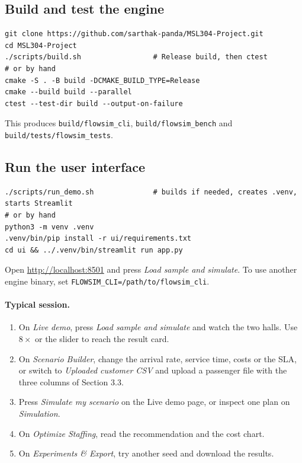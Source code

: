 \documentclass[11pt,a4paper]{article}
\newcommand{\code}[1]{\texttt{#1}}
\begin{document}
\subsection{Build and test the engine}
\begin{lstlisting}
git clone https://github.com/sarthak-panda/MSL304-Project.git
cd MSL304-Project
./scripts/build.sh                 # Release build, then ctest
# or by hand
cmake -S . -B build -DCMAKE_BUILD_TYPE=Release
cmake --build build --parallel
ctest --test-dir build --output-on-failure
\end{lstlisting}
This produces \code{build/flowsim\_cli}, \code{build/flowsim\_bench} and \code{build/tests/flowsim\_tests}.

\subsection{Run the user interface}
\begin{lstlisting}
./scripts/run_demo.sh              # builds if needed, creates .venv, starts Streamlit
# or by hand
python3 -m venv .venv
.venv/bin/pip install -r ui/requirements.txt
cd ui && ../.venv/bin/streamlit run app.py
\end{lstlisting}
Open \url{http://localhost:8501} and press \emph{Load sample and simulate}. To use another engine binary, set
\code{FLOWSIM\_CLI=/path/to/flowsim\_cli}.

\paragraph{Typical session.}
\begin{enumerate}
  \item On \emph{Live demo}, press \emph{Load sample and simulate} and watch the two halls. Use $8\times$ or the slider to
    reach the result card.
  \item On \emph{Scenario Builder}, change the arrival rate, service time, costs or the SLA, or switch to
    \emph{Uploaded customer CSV} and upload a passenger file with the three columns of Section 3.3.
  \item Press \emph{Simulate my scenario} on the Live demo page, or inspect one plan on \emph{Simulation}.
  \item On \emph{Optimize Staffing}, read the recommendation and the cost chart.
  \item On \emph{Experiments \& Export}, try another seed and download the results.
\end{enumerate}
\end{document}
